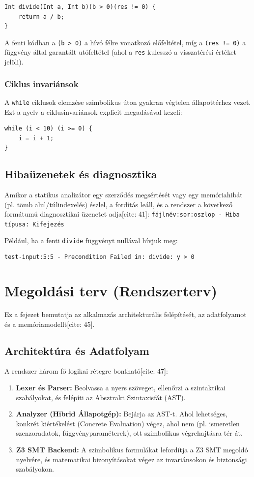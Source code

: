 \documentclass[
    hungarian,
    parspace
]{elteikthesis}
\begin{document}
\begin{verbatim}
Int divide(Int a, Int b)(b > 0)(res != 0) { 
    return a / b; 
}
\end{verbatim}
A fenti kódban a \texttt{(b > 0)} a hívó félre vonatkozó előfeltétel, míg a \texttt{(res != 0)} a függvény által garantált utófeltétel (ahol a \texttt{res} kulcsszó a visszatérési értéket jelöli).

\subsection{Ciklus invariánsok}
A \texttt{while} ciklusok elemzése szimbolikus úton gyakran végtelen állapottérhez vezet. Ezt a nyelv a ciklusinvariánsok explicit megadásával kezeli:
\begin{verbatim}
while (i < 10) (i >= 0) {
    i = i + 1;
}
\end{verbatim}

\section{Hibaüzenetek és diagnosztika}
Amikor a statikus analizátor egy szerződés megsértését vagy egy memóriahibát (pl. tömb alul/túlindexelés) észlel, a fordítás leáll, és a rendszer a következő formátumú diagnosztikai üzenetet adja[cite: 41]:
\texttt{fájlnév:sor:oszlop - Hiba típusa: Kifejezés}

Például, ha a fenti \texttt{divide} függvényt nullával hívjuk meg:
\begin{verbatim}
test-input:5:5 - Precondition Failed in: divide: y > 0
\end{verbatim}

\chapter{Megoldási terv (Rendszerterv)}
Ez a fejezet bemutatja az alkalmazás architekturális felépítését, az adatfolyamot és a memóriamodellt[cite: 45].

\section{Architektúra és Adatfolyam}
A rendszer három fő logikai rétegre bontható[cite: 47]:
\begin{enumerate}
    \item \textbf{Lexer és Parser:} Beolvassa a nyers szöveget, ellenőrzi a szintaktikai szabályokat, és felépíti az Absztrakt Szintaxisfát (AST).
    \item \textbf{Analyzer (Hibrid Állapotgép):} Bejárja az AST-t. Ahol lehetséges, konkrét kiértékelést (Concrete Evaluation) végez, ahol nem (pl. ismeretlen szenzoradatok, függvényparaméterek), ott szimbolikus végrehajtásra tér át.
    \item \textbf{Z3 SMT Backend:} A szimbolikus formulákat lefordítja a Z3 SMT megoldó nyelvére, és matematikai bizonyításokat végez az invariánsokon és biztonsági szabályokon.
\end{enumerate}
\end{document}
